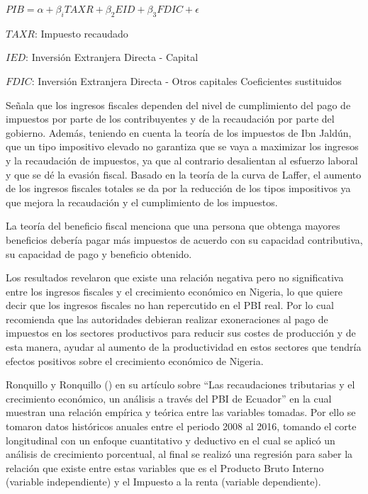 \documentclass[
  jou,
  floatsintext,
  longtable,
  a4paper,
  nolmodern,
  notxfonts,
  notimes,
  12pt,
  colorlinks=true,linkcolor=blue,citecolor=blue,urlcolor=blue]{apa7}
\begin{document}
\(PIB = \alpha + \beta_{i}TAXR + \beta_{2}EID + \beta_{3}FDIC + \epsilon\)

\(TAXR\): Impuesto recaudado

\(IED\): Inversión Extranjera Directa - Capital

\(FDIC\): Inversión Extranjera Directa - Otros capitales Coeficientes
sustituidos

Señala que los ingresos fiscales dependen del nivel de cumplimiento del
pago de impuestos por parte de los contribuyentes y de la recaudación
por parte del gobierno. Además, teniendo en cuenta la teoría de los
impuestos de Ibn Jaldún, que un tipo impositivo elevado no garantiza que
se vaya a maximizar los ingresos y la recaudación de impuestos, ya que
al contrario desalientan al esfuerzo laboral y que se dé la evasión
fiscal. Basado en la teoría de la curva de Laffer, el aumento de los
ingresos fiscales totales se da por la reducción de los tipos
impositivos ya que mejora la recaudación y el cumplimiento de los
impuestos.

La teoría del beneficio fiscal menciona que una persona que obtenga
mayores beneficios debería pagar más impuestos de acuerdo con su
capacidad contributiva, su capacidad de pago y beneficio obtenido.

Los resultados revelaron que existe una relación negativa pero no
significativa entre los ingresos fiscales y el crecimiento económico en
Nigeria, lo que quiere decir que los ingresos fiscales no han
repercutido en el PBI real. Por lo cual recomienda que las autoridades
debieran realizar exoneraciones al pago de impuestos en los sectores
productivos para reducir sus costes de producción y de esta manera,
ayudar al aumento de la productividad en estos sectores que tendría
efectos positivos sobre el crecimiento económico de Nigeria.

Ronquillo y Ronquillo
() en su artículo sobre
``Las recaudaciones tributarias y el crecimiento económico, un análisis
a través del PBI de Ecuador'' en la cual muestran una relación empírica
y teórica entre las variables tomadas. Por ello se tomaron datos
históricos anuales entre el periodo 2008 al 2016, tomando el corte
longitudinal con un enfoque cuantitativo y deductivo en el cual se
aplicó un análisis de crecimiento porcentual, al final se realizó una
regresión para saber la relación que existe entre estas variables que es
el Producto Bruto Interno (variable independiente) y el Impuesto a la
renta (variable dependiente).
\end{document}
